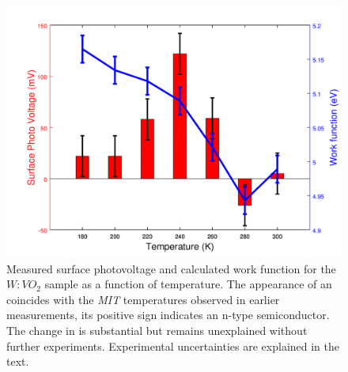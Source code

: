 \begin{figure}
\centering
	\includegraphics[width=0.8\linewidth]{./figs/vox3}
	\caption{Measured surface photovoltage and calculated work function for the $W:VO_2$ sample as a function of temperature. The appearance of an \spv{} coincides with the \emph{MIT} temperatures observed in earlier measurements, its positive sign indicates an n-type semiconductor. The change in \wf{} is substantial but remains unexplained without further experiments. Experimental uncertainties are explained in the text.}
	\label{fig:vox3}
\end{figure}
